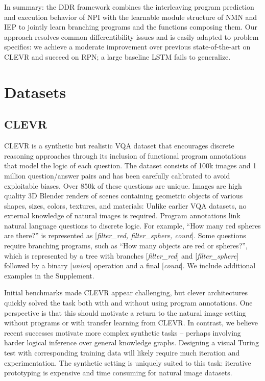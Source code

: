 \documentclass{article}
\begin{document}
In summary: the DDR framework combines the interleaving program prediction and execution behavior of NPI with the learnable module structure of NMN and IEP to jointly learn branching programs and the functions composing them. Our approach resolves common differentibility issues and is easily adapted to problem specifics: we achieve a moderate improvement over previous state-of-the-art on CLEVR and succeed on RPN; a large baseline LSTM fails to generalize.
\newpage
\section{Datasets}
\subsection{CLEVR}
CLEVR is a synthetic but realistic VQA dataset that encourages discrete reasoning approaches through its inclusion of functional program annotations that model the logic of each question. The dataset consists of 100k images and 1 million question/answer pairs and has been carefully calibrated to avoid exploitable biases. Over 850k of these questions are unique. Images are high quality 3D Blender \cite{Blender} renders of scenes containing geometric objects of various shapes, sizes, colors, textures, and materials: Unlike earlier VQA datasets, no external knowledge of natural images is required. Program annotations link natural language questions to discrete logic. For example, ``How many red spheres are there?'' is represented as [\textit{filter\_red, filter\_sphere, count}]. Some questions require branching programs, such as ``How many objects are red or spheres?'', which is represented by a tree with branches [\textit{filter\_red}] and [\textit{filter\_sphere}] followed by a binary [\textit{union}] operation and a final [\textit{count}]. We include additional examples in the Supplement. 

Initial benchmarks made CLEVR appear challenging, but clever architectures quickly solved the task both with and without using program annotations. One perspective is that this should motivate a return to the natural image setting without programs or with transfer learning from CLEVR. In contrast, we believe recent successes motivate more complex synthetic tasks -- perhaps involving harder logical inference over general knowledge graphs. Designing a visual Turing test with corresponding training data will likely require much iteration and experimentation. The synthetic setting is uniquely suited to this task: iterative prototyping is expensive and time consuming for natural image datasets.
\end{document}

